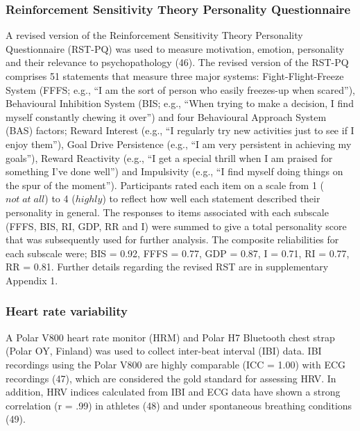 \documentclass[
  english,
  man]{apa6}
\begin{document}
\hypertarget{reinforcement-sensitivity-theory-personality-questionnaire}{%
\subsubsection{Reinforcement Sensitivity Theory Personality Questionnaire}\label{reinforcement-sensitivity-theory-personality-questionnaire}}

A revised version of the Reinforcement Sensitivity Theory Personality Questionnaire (RST-PQ) was used to measure motivation, emotion, personality and their relevance to psychopathology (46).
The revised version of the RST-PQ comprises 51 statements that measure three major systems: Fight-Flight-Freeze System (FFFS; e.g., ``I am the sort of person who easily freezes-up when scared''), Behavioural Inhibition System (BIS; e.g., ``When trying to make a decision, I find myself constantly chewing it over'') and four Behavioural Approach System (BAS) factors; Reward Interest (e.g., ``I regularly try new activities just to see if I enjoy them''), Goal Drive Persistence (e.g., ``I am very persistent in achieving my goals''), Reward Reactivity (e.g., ``I get a special thrill when I am praised for something I've done well'') and Impulsivity (e.g., ``I find myself doing things on the spur of the moment'').
Participants rated each item on a scale from 1 (\(not\; at\; all\)) to 4 (\(highly\)) to reflect how well each statement described their personality in general.
The responses to items associated with each subscale (FFFS, BIS, RI, GDP, RR and I) were summed to give a total personality score that was subsequently used for further analysis.
The composite reliabilities for each subscale were; BIS = 0.92, FFFS = 0.77, GDP = 0.87, I = 0.71, RI = 0.77, RR = 0.81. Further details regarding the revised RST are in supplementary Appendix 1.

\hypertarget{heart-rate-variability}{%
\subsubsection{Heart rate variability}\label{heart-rate-variability}}

A Polar V800 heart rate monitor (HRM) and Polar H7 Bluetooth chest strap (Polar OY, Finland) was used to collect inter-beat interval (IBI) data.
IBI recordings using the Polar V800 are highly comparable (ICC = 1.00) with ECG recordings (47), which are considered the gold standard for assessing HRV.
In addition, HRV indices calculated from IBI and ECG data have shown a strong correlation (r = .99) in athletes (48) and under spontaneous breathing conditions (49).
\end{document}
